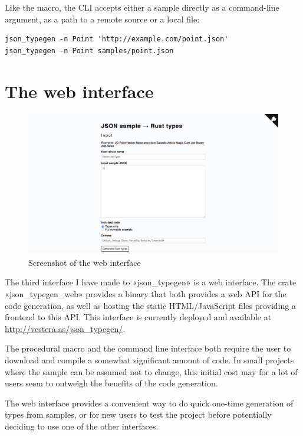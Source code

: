 Like the macro, the CLI accepts either a sample directly as a command-line argument, as a path to a remote source or a local file:

\begin{verbatim}
json_typegen -n Point 'http://example.com/point.json'
json_typegen -n Point samples/point.json
\end{verbatim}


\section{The web interface}

\begin{figure}[ht!]
\includegraphics[width=\textwidth]{json_typegen_web}
\hspace*{-1.5in} %
\caption{Screenshot of the web interface}
\label{fig:web-screenshot}
\end{figure}

The third interface I have made to «json_typegen» is a web interface. The crate «json_typegen_web» provides a binary that both provides a web API for the code generation, as well as hosting the static HTML/JavaScript files providing a frontend to this API. This interface is currently deployed and available at \url{http://vestera.as/json_typegen/}.

The procedural macro and the command line interface both require the user to download and compile a somewhat significant amount of code. In small projects where the sample can be assumed not to change, this initial cost may for a lot of users seem to outweigh the benefits of the code generation.

The web interface provides a convenient way to do quick one-time generation of types from samples, or for new users to test the project before potentially deciding to use one of the other interfaces.

